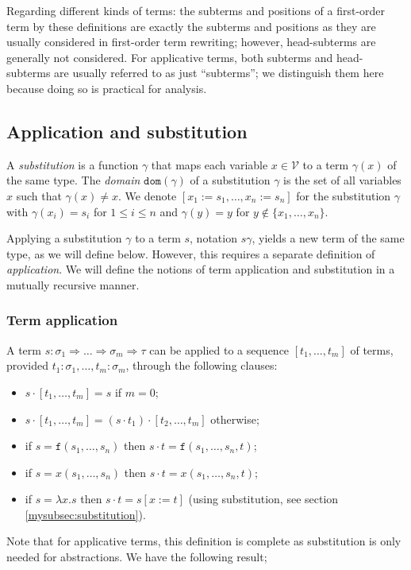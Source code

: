 \documentclass{lmcs}
\theoremstyle{theorem}\newtheorem{theorem}{Theorem}
\theoremstyle{theorem}\newtheorem{lemma}[theorem]{Lemma}
\theoremstyle{theorem}\newtheorem{corollary}[theorem]{Corollary}
\theoremstyle{definition}\newtheorem{definition}[theorem]{Definition}
\theoremstyle{definition}\newtheorem{example}[theorem]{Example}
\newcommand{\V}{\mathcal{V}}
\newcommand{\domain}{\mathtt{dom}}
\newcommand{\atype}{\sigma}
\newcommand{\btype}{\tau}
\newcommand{\identifier}[1]{\mathtt{#1}}
\newcommand{\afun}{\identifier{f}}
\newcommand{\avar}{x}
\newcommand{\abs}[2]{\lambda #1.#2}
\newcommand{\arrtype}{\Rightarrow}
\newcommand{\mysubsection}[1]{\vspace{-12pt}\subsubsection{#1}}
\begin{document}
Regarding different kinds of terms: the subterms and positions of a first-order term by these
definitions are exactly the subterms and positions as they are usually considered in first-order
term rewriting; however, head-subterms are generally not considered.  For applicative terms,
both subterms and head-subterms are usually referred to as just ``subterms''; we distinguish them
here because doing so is practical for analysis.

\subsection{Application and substitution}

A \emph{substitution} is a function $\gamma$ that maps each variable $\avar \in \V$ to a term
$\gamma(\avar)$ of the same type.
The \emph{domain} $\domain(\gamma)$ of a substitution $\gamma$ is the set of all variables $x$
such that $\gamma(x) \neq x$.
We denote $[x_1:=s_1,\dots,x_n:=s_n]$ for the substitution $\gamma$ with $\gamma(x_i) = s_i$ for
$1 \leq i \leq n$ and $\gamma(y) = y$ for $y \notin \{x_1,\dots,x_n\}$.

Applying a substitution $\gamma$ to a term $s$, notation $s\gamma$, yields a new term of the same
type, as we will define below. However, this requires a separate definition of \emph{application}.
We will define the notions of term application and substitution in a mutually recursive manner.

\mysubsection{Term application}\label{mysubsec:application}
A term $s : \atype_1 \arrtype \dots \arrtype \atype_m \arrtype \btype$ can be applied to a sequence
$[t_1,\dots,t_m]$ of terms, provided $t_1 : \atype_1,\dots,t_m : \atype_m$, through the following
clauses:
\begin{itemize}
\item $s \cdot [t_1,\dots,t_m] = s$ if $m = 0$;
\item $s \cdot [t_1,\dots,t_m] = (s \cdot t_1) \cdot [t_2,\dots,t_m]$ otherwise;
\item if $s = \afun(s_1,\dots,s_n)$ then $s \cdot t = \afun(s_1,\dots,s_n,t)$;
\item if $s = \avar(s_1,\dots,s_n)$ then $s \cdot t = \avar(s_1,\dots,s_n,t)$;
\item if $s = \abs{\avar}{s}$ then $s \cdot t = s[\avar:=t]$ (using substitution, 
  see section \ref{mysubsec:substitution}).
\end{itemize}

\bigskip
Note that for applicative terms, this definition is complete as substitution is only needed for
abstractions.  We have the following result;
\end{document}
